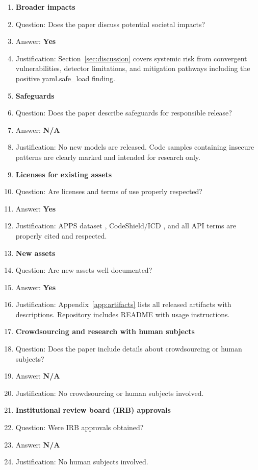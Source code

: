 \documentclass{article}
\providecommand{\answerYes}[1][]{\textbf{Yes}}
\providecommand{\answerNA}[1][]{\textbf{N/A}}
\begin{document}
\begin{enumerate}
\item {\bf Broader impacts}
    \item[] Question: Does the paper discuss potential societal impacts?
    \item[] Answer: \answerYes{}
    \item[] Justification: Section~\ref{sec:discussion} covers systemic risk from convergent vulnerabilities, detector limitations, and mitigation pathways including the positive yaml.safe\_load finding.

\item {\bf Safeguards}
    \item[] Question: Does the paper describe safeguards for responsible release?
    \item[] Answer: \answerNA{}
    \item[] Justification: No new models are released. Code samples containing insecure patterns are clearly marked and intended for research only.

\item {\bf Licenses for existing assets}
    \item[] Question: Are licenses and terms of use properly respected?
    \item[] Answer: \answerYes{}
    \item[] Justification: APPS dataset \citep{hendrycks2021apps}, CodeShield/ICD \citep{bhatt2023cyberseceval}, and all API terms are properly cited and respected.

\item {\bf New assets}
    \item[] Question: Are new assets well documented?
    \item[] Answer: \answerYes{}
    \item[] Justification: Appendix~\ref{app:artifacts} lists all released artifacts with descriptions. Repository includes README with usage instructions.

\item {\bf Crowdsourcing and research with human subjects}
    \item[] Question: Does the paper include details about crowdsourcing or human subjects?
    \item[] Answer: \answerNA{}
    \item[] Justification: No crowdsourcing or human subjects involved.

\item {\bf Institutional review board (IRB) approvals}
    \item[] Question: Were IRB approvals obtained?
    \item[] Answer: \answerNA{}
    \item[] Justification: No human subjects involved.


\end{enumerate}
\end{document}
